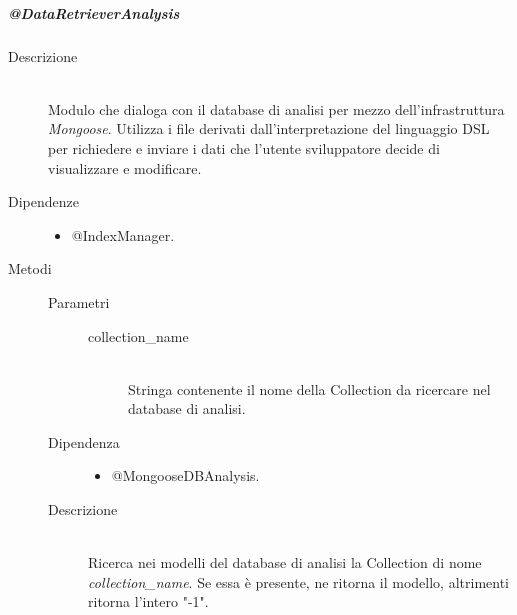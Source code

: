 \subparagraph{@DataRetrieverAnalysis}
\begin{description}
\item[Descrizione] \hfill \\
Modulo che dialoga con il database di analisi per mezzo dell'infrastruttura \textit{Mongoose}. Utilizza i file derivati dall'interpretazione del 
linguaggio DSL per richiedere e inviare i dati che l'utente sviluppatore decide di visualizzare e modificare.
\item[Dipendenze] \hfill 
\begin{itemize}
\item @IndexManager.
\end{itemize}

\item[Metodi]
\begin{mldescription}
	 \hfill 
		\begin{description}
			\item[Parametri] \hfill
				\begin{description}
					\item[collection\_name] \hfill \\
					Stringa contenente il nome della Collection da ricercare nel database di analisi.
				\end{description}
			\item[Dipendenza] \hfill
				\begin{itemize}
					\item @MongooseDBAnalysis.
				\end{itemize}
			\item[Descrizione] \hfill \\
			Ricerca nei modelli del database di analisi la Collection di nome \textit{collection\_name}.
Se essa è presente, ne ritorna il modello, altrimenti ritorna l'intero "-1".
		\end{description}


\end{mldescription}
\end{description}
